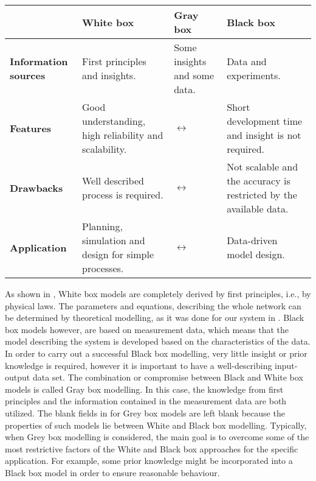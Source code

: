 \begin{center}
    \begin{tabular}{ | >{\centering\arraybackslash}m{1.8cm} | >{\centering\arraybackslash}m{3.6cm} | >{\centering\arraybackslash}m{3.6cm} | >{\centering\arraybackslash}m{3.6cm} |}
    \hline
    \multirow{1}{*}
     & \textbf{White box} & \textbf{Gray box} & \textbf{Black box} \\ 
     \hline
     \multirow{1}{*}
    \textbf{Information sources} & First principles and insights. &  Some insights and some data. & Data and experiments.\\ 
    \hline
      \multirow{1}{*}
    \textbf{Features} & Good understanding, high reliability and scalability. & $\longleftrightarrow$  & Short development time and insight is not required.\\ 
    \hline
      \multirow{1}{*}
    \textbf{Drawbacks} & Well described process is required. & $\longleftrightarrow$ & Not scalable and the accuracy is restricted by the available data.\\ 
    \hline
          \multirow{1}{*}
    \textbf{Application} & Planning, simulation and design for simple processes. & $\longleftrightarrow$ & Data-driven model design.\\ 
    \hline
    \end{tabular}
    \label{comparisontable_sysid}
\end{center}

As shown in , White box models are completely derived by first principles, i.e., by physical laws. The parameters and equations, describing the whole network can be determined by theoretical modelling, as it was done for our system in . Black box models however, are based on measurement data, which means that the model describing the system is developed based on the characteristics of the data. In order to carry out a successful Black box modelling, very little insight or prior knowledge is required, however it is important to have a well-describing input-output data set. The combination or compromise between Black and White box models is called Gray box modelling. In this case, the knowledge from first principles and the information contained in the measurement data are both utilized. The blank fields in  for Grey box models are left blank because the properties of such models lie between White and Black box modelling. Typically, when Grey box modelling is considered, the main goal is to overcome some of the most restrictive factors of the White and Black box approaches for the specific application. For example, some prior knowledge might be incorporated into a Black box model in order to ensure reasonable behaviour\cite{nelles2013nonlinear}. 

